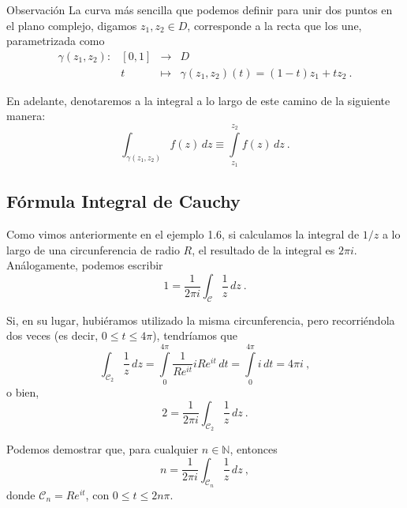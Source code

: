 \begin{obs}{Observación}
    La curva más sencilla que podemos definir para unir dos puntos en el plano complejo, digamos $z_1, z_2 \in D$, corresponde a la recta que los une, parametrizada como 
    \begin{equation}
        \begin{array}{crcl}
            \gamma(z_1, z_2): & [0,1] & \to & D \\
            & t & \mapsto & \gamma(z_1, z_2)(t) = (1-t)z_1 + tz_2 \ .
        \end{array}
    \end{equation}

    En adelante, denotaremos a la integral a lo largo de este camino de la siguiente manera:
    \begin{equation}
        \int_{\gamma(z_1, z_2)} f(z) \, dz \equiv \int\limits_{z_1}^{z_2} f(z) \, dz \ .
    \end{equation}
\end{obs}

\subsection{Fórmula Integral de Cauchy}

Como vimos anteriormente en el ejemplo 1.6, si calculamos la integral de $1/z$ a lo largo de una circunferencia de radio $R$, el resultado de la integral es $2 \pi i$. Análogamente, podemos escribir 
\begin{equation*}
    1 = \frac{1}{2\pi i} \int_{\mathcal{C}} \frac{1}{z} \, dz \ .
\end{equation*} 

Si, en su lugar, hubiéramos utilizado la misma circunferencia, pero recorriéndola dos veces (es decir, $0 \leq t \leq 4\pi$), tendríamos que
\begin{equation*}
    \int_{\mathcal{C}_2} \frac{1}{z} \, dz = \int\limits_0^{4\pi} \frac{1}{Re^{it}} i Re^{it} \, dt = \int\limits_0^{4\pi} i \, dt = 4\pi i \ , 
\end{equation*}
o bien,
\begin{equation*}
    2 = \frac{1}{2\pi i} \int_{\mathcal{C}_2} \frac{1}{z} \, dz \ .
\end{equation*}

Podemos demostrar que, para cualquier $n \in \mathbb{N}$, entonces
\begin{equation}
    n = \frac{1}{2\pi i} \int_{\mathcal{C}_n} \frac{1}{z} \, dz \ ,
\end{equation}
donde $\mathcal{C}_n = Re^{it}$, con $0 \leq t \leq 2n\pi$.

